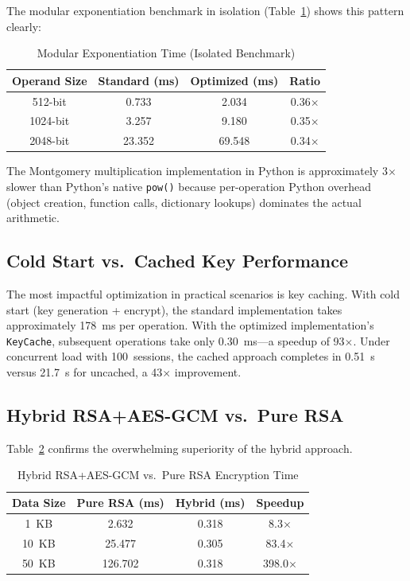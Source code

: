 \documentclass[conference]{IEEEtran}
\begin{document}
The modular exponentiation benchmark in isolation (Table~\ref{tab:modexp}) shows this pattern clearly:

\begin{table}[htbp]
\caption{Modular Exponentiation Time (Isolated Benchmark)}
\begin{center}
\begin{tabular}{|c|c|c|c|}
\hline
\textbf{Operand Size} & \textbf{Standard (ms)} & \textbf{Optimized (ms)} & \textbf{Ratio} \\
\hline
512-bit & 0.733 & 2.034 & 0.36$\times$ \\
\hline
1024-bit & 3.257 & 9.180 & 0.35$\times$ \\
\hline
2048-bit & 23.352 & 69.548 & 0.34$\times$ \\
\hline
\end{tabular}
\label{tab:modexp}
\end{center}
\end{table}

The Montgomery multiplication implementation in Python is approximately 3$\times$ slower than Python's native \texttt{pow()} because per-operation Python overhead (object creation, function calls, dictionary lookups) dominates the actual arithmetic.

\subsection{Cold Start vs.\ Cached Key Performance}

The most impactful optimization in practical scenarios is key caching. With cold start (key generation + encrypt), the standard implementation takes approximately 178~ms per operation. With the optimized implementation's \texttt{KeyCache}, subsequent operations take only 0.30~ms---a speedup of 93$\times$. Under concurrent load with 100~sessions, the cached approach completes in 0.51~s versus 21.7~s for uncached, a 43$\times$ improvement.

\subsection{Hybrid RSA+AES-GCM vs.\ Pure RSA}

Table~\ref{tab:hybrid} confirms the overwhelming superiority of the hybrid approach.

\begin{table}[htbp]
\caption{Hybrid RSA+AES-GCM vs.\ Pure RSA Encryption Time}
\begin{center}
\begin{tabular}{|c|c|c|c|}
\hline
\textbf{Data Size} & \textbf{Pure RSA (ms)} & \textbf{Hybrid (ms)} & \textbf{Speedup} \\
\hline
1~KB & 2.632 & 0.318 & 8.3$\times$ \\
\hline
10~KB & 25.477 & 0.305 & 83.4$\times$ \\
\hline
50~KB & 126.702 & 0.318 & 398.0$\times$ \\
\hline
\end{tabular}
\label{tab:hybrid}
\end{center}
\end{table}
\end{document}
